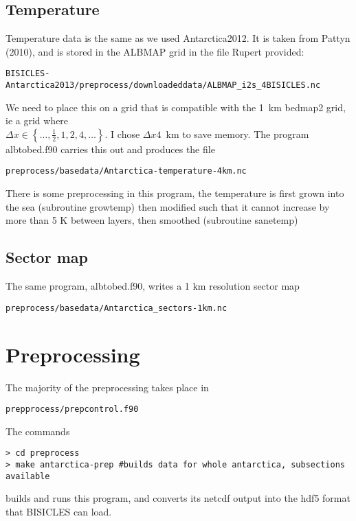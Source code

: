 \documentclass{article}
\begin{document}
\subsection{Temperature}

Temperature data is the same as we used Antarctica2012. It is taken from Pattyn (2010), and
is stored in the ALBMAP grid in the file Rupert provided:
\begin{verbatim}
BISICLES-Antarctica2013/preprocess/downloadeddata/ALBMAP_i2s_4BISICLES.nc
\end{verbatim}
We need to place this on a grid that is compatible with the 1~km bedmap2 grid, ie a 
grid where \\ $\Delta x \in \left \{ \ldots, \frac{1}{2}, 1, 2, 4,\ldots \right \}$. I chose 
$\Delta x 4$~km to save memory. The program
albtobed.f90 carries this out and produces the file
\begin{verbatim}
preprocess/basedata/Antarctica-temperature-4km.nc
\end{verbatim}
There is some preprocessing in this program, the temperature is first
grown into the sea (subroutine growtemp) then modified such that it cannot increase
by more than 5 K between layers, then smoothed (subroutine sanetemp)

\subsection{Sector map}

The same program, albtobed.f90, writes a 1 km resolution sector map 
\begin{verbatim}
preprocess/basedata/Antarctica_sectors-1km.nc
\end{verbatim}

\section{\label{sec::preprocessing}Preprocessing}

The majority of the preprocessing takes place in
\begin{verbatim}
prepprocess/prepcontrol.f90
\end{verbatim}
The commands
\begin{verbatim}
> cd preprocess 
> make antarctica-prep #builds data for whole antarctica, subsections available 
\end{verbatim}
builds and runs this program, and converts its netcdf output into the hdf5 format that 
BISICLES can load.
\end{document}
